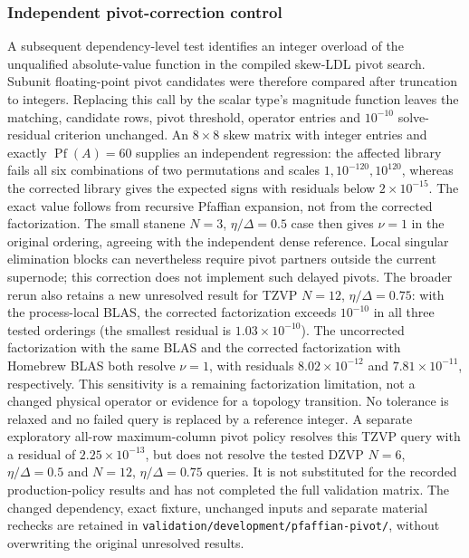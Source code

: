 \documentclass[11pt]{article}
\begin{document}
\subsubsection{Independent pivot-correction control}
A subsequent dependency-level test identifies an integer overload
of the unqualified absolute-value function in the compiled
skew-LDL pivot search. Subunit floating-point pivot candidates
were therefore compared after truncation to integers. Replacing
this call by the scalar type's magnitude function leaves the
matching, candidate rows, pivot threshold, operator entries and
$10^{-10}$ solve-residual criterion unchanged.
An $8\times8$ skew matrix with integer entries and exactly
$\operatorname{Pf}(A)=60$ supplies an independent regression:
the affected library fails all six combinations of two
permutations and scales $1,10^{-120},10^{120}$, whereas the
corrected library gives the expected signs with residuals below
$2\times10^{-15}$. The exact value follows from recursive
Pfaffian expansion, not from the corrected factorization.
The small stanene $N=3$, $\eta/\Delta=0.5$ case then gives
$\nu=1$ in the original ordering, agreeing with the independent
dense reference. Local singular elimination blocks can nevertheless
require pivot partners outside the current supernode; this
correction does not implement such delayed pivots.
The broader rerun also retains a new unresolved result for
TZVP $N=12$, $\eta/\Delta=0.75$: with the process-local
BLAS, the corrected factorization exceeds $10^{-10}$ in all
three tested orderings (the smallest residual is
$1.03\times10^{-10}$). The uncorrected factorization with the
same BLAS and the corrected factorization with Homebrew BLAS
both resolve $\nu=1$, with residuals $8.02\times10^{-12}$ and
$7.81\times10^{-11}$, respectively. This sensitivity is a
remaining factorization limitation, not a changed physical
operator or evidence for a topology transition. No tolerance is
relaxed and no failed query is replaced by a reference integer.
A separate exploratory all-row maximum-column pivot policy
resolves this TZVP query with a residual of
$2.25\times10^{-13}$, but does not resolve the tested DZVP
$N=6$, $\eta/\Delta=0.5$ and $N=12$, $\eta/\Delta=0.75$
queries. It is not substituted for the recorded production-policy
results and has not completed the full validation matrix.
The changed dependency, exact fixture, unchanged inputs and
separate material rechecks are retained in
\nolinkurl{validation/development/pfaffian-pivot/}, without
overwriting the original unresolved results.
\end{document}
